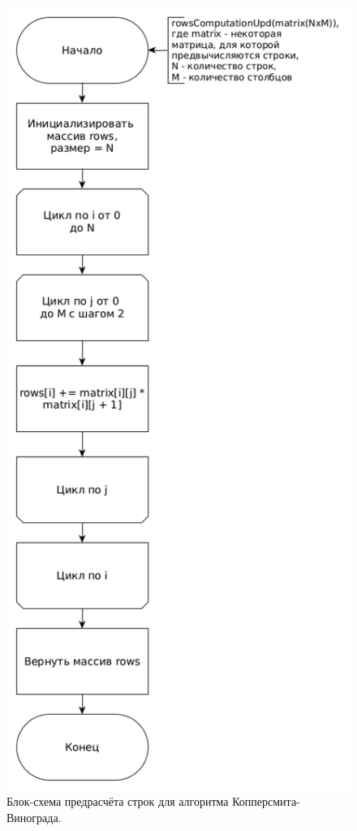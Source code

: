 \documentclass[12pt]{report}
\begin{document}
\begin{figure}
\begin{center}
\includegraphics[scale=0.4]{inc/img/rowsCompUpd.png}
\captionsetup{justification=centering}
	\caption{Блок-схема предрасчёта строк для алгоритма Копперсмита-Винограда.}
	\label{img:rowsPreComp}	
\end{center}
\end{figure}
\end{document}
